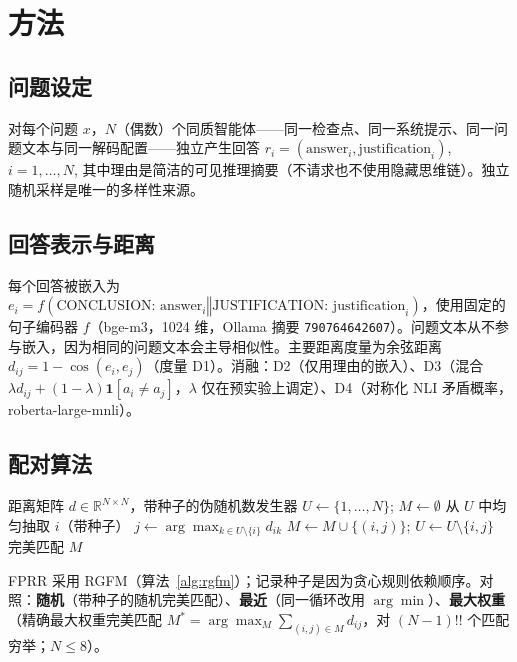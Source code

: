 \documentclass[UTF8,11pt]{ctexart}
\begin{document}
\section{方法}
\label{sec:method}

\subsection{问题设定}
对每个问题 $x$，$N$（偶数）个同质智能体——同一检查点、同一系统提示、同一问题文本与同一解码配置——独立产生回答
$r_i = (\text{answer}_i, \text{justification}_i)$, $i=1,\dots,N$,
其中理由是简洁的可见推理摘要（不请求也不使用隐藏思维链）。独立随机采样是唯一的多样性来源。

\subsection{回答表示与距离}
每个回答被嵌入为 $e_i = f(\text{CONCLUSION: answer}_i \mathbin{\Vert} \text{JUSTIFICATION: justification}_i)$，使用固定的句子编码器 $f$（bge-m3，1024 维，Ollama 摘要 \texttt{790764642607}）。问题文本从不参与嵌入，因为相同的问题文本会主导相似性。主要距离度量为余弦距离 $d_{ij} = 1 - \cos(e_i, e_j)$（度量 D1）。消融：D2（仅用理由的嵌入）、D3（混合 $\lambda d_{ij} + (1-\lambda)\mathbf{1}[a_i \neq a_j]$，$\lambda$ 仅在预实验上调定）、D4（对称化 NLI 矛盾概率，roberta-large-mnli）。

\subsection{配对算法}
\begin{algorithm}[t]
\caption{随机贪心最远匹配（RGFM）}
\label{alg:rgfm}
\begin{algorithmic}[1]
\Require 距离矩阵 $d \in \mathbb{R}^{N\times N}$，带种子的伪随机数发生器
\State $U \gets \{1,\dots,N\}$; $M \gets \emptyset$
  \State 从 $U$ 中均匀抽取 $i$（带种子）
  \State $j \gets \arg\max_{k \in U \setminus \{i\}} d_{ik}$
  \State $M \gets M \cup \{(i,j)\}$; $U \gets U \setminus \{i,j\}$
\EndWhile
\State \Return 完美匹配 $M$
\end{algorithmic}
\end{algorithm}

FPRR 采用 RGFM（算法~\ref{alg:rgfm}）；记录种子是因为贪心规则依赖顺序。对照：\textbf{随机}（带种子的随机完美匹配）、\textbf{最近}（同一循环改用 $\arg\min$）、\textbf{最大权重}（精确最大权重完美匹配 $M^* = \arg\max_M \sum_{(i,j)\in M} d_{ij}$，对 $(N-1)!!$ 个匹配穷举；$N \le 8$）。
\end{document}
